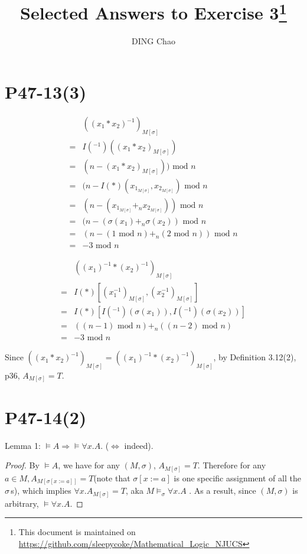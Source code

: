 \documentclass{article}
\author{DING Chao}
\title{Selected Answers to Exercise 3\footnote{This document is maintained on \url{https://github.com/sleepycoke/Mathematical_Logic_NJUCS}}}
\begin{document}
\maketitle
\section{P47-13(3)}
\begin{align*}
	 &((x_1*x_2)^{-1})_{M[\sigma]}\\
	=&I(^{-1})((x_1*x_2)_{M[\sigma]})\\
	=&(n - (x_1*x_2)_{M[\sigma]})) \mbox{ mod } n\\
	=&(n - I(*)(x_{1_{M[\sigma]}}, x_{2_{M[\sigma]}})\text{ mod } n\\
	=&(n - (x_{1_{M[\sigma]}} +_n x_{2_{M[\sigma]}})) \mbox{ mod } n\\
	=&(n - (\sigma(x_1) +_n \sigma(x_2))  \mbox{ mod }  n\\
	=&(n - (1  \text{ mod }  n) +_n (2  \text{ mod }   n) )  \mbox{ mod }  n\\
	=&-3  \mbox{ mod }  n
\end{align*}

\bigbreak

\begin{align*}
&((x_1)^{-1}*(x_2)^{-1})_{M[\sigma]}\\
=&I(*)[(x_1^{-1})_{M[\sigma]}, (x_2^{-1})_{M[\sigma]}]\\
=&I(*)[I(^{-1})(\sigma(x_1)), I(^{-1})(\sigma(x_2))]\\
=&((n - 1) \mbox{ mod } n) +_n ((n - 2) \mbox{ mod } n)\\
=&-3 \mbox{ mod } n
\end{align*}

Since $((x_1*x_2)^{-1})_{M[\sigma]} = ((x_1)^{-1}*(x_2)^{-1})_{M[\sigma]}$, by Definition 3.12(2), p36, $A_{M[\sigma]} = T$. 

\section{P47-14(2)}
Lemma 1: $\models A \Rightarrow \models \forall x. A$. ($\Leftrightarrow$ indeed).

\begin{proof}
	By $\models A$, we have for any $(M, \sigma)$, $A_{M[\sigma]} = T$. Therefore for any $a \in M, A_{M[\sigma[x:=a]]} = T$(note that $\sigma[x:=a]$ is one specific assignment of all the $\sigma\,$s), 	which implies $\forall x.A _{M[\sigma]} = T$, aka $M \models _\sigma \forall x.A$ . As a result, since $(M, \sigma)$ is arbitrary, $\models \forall x. A$. 
\end{proof}
\end{document}
